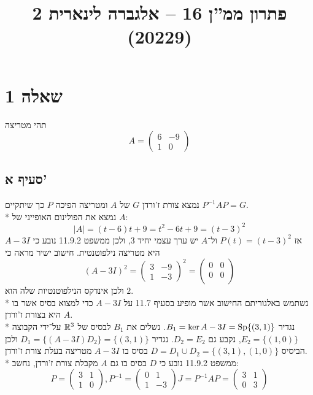 
\title{פתרון ממ''ן 16 – אלגברה לינארית 2 (20229)}


\maketitle
\maketitleprint{}

\section{שאלה 1}
תהי מטריצה
\[
	A = \begin{pmatrix}
		6 & -9 \\
		1 & 0
	\end{pmatrix}
\]
\subsection{סעיף א'}
נמצא צורת ז'ורדן $G$ של $A$ ומטריצה הפיכה $P$ כך שיתקיים $P^{-1} A P = G$. \\*
נמצא את הפולינום האופייני של $A$:
\[
	|A| = (t - 6) t + 9 = t^2 - 6t + 9 = {(t - 3)}^2
\]
אז $P(t) = {(t - 3)}^2$ ול־$A$ יש ערך עצמי יחיד $3$, ולכן ממשפט 11.9.2 נובע כי $A - 3I$ היא מטריצה נילפוטנטית.
חישוב ישיר מראה כי
\[
	{(A - 3I)}^2
	= \begin{pmatrix}
		3 & -9 \\
		1 & -3
	\end{pmatrix}^2
	= \begin{pmatrix}
		0 & 0 \\
		0 & 0 \\
	\end{pmatrix}
\]
ולכן אינדקס הנילפוטנטיות שלה הוא $2$. \\*
נשתמש באלגוריתם החישוב אשר מופיע בסעיף 11.7 על $A - 3I$ כדי למצוא בסיס אשר בו $A$ היא בצורת ז'ורדן. \\*
נגדיר $B_1 = \ker A - 3I = \operatorname{Sp}\{ (3, 1) \}$. נשלים את $B_1$ לבסיס של $\mathbb{R}^3$ על־ידי הקבוצה $E_2 = \{ (1, 0) \}$, נקבע גם $D_2 = E_2$. 
נגדיר $D_1 = \{ (A - 3I) D_2 \} = \{ (3, 1) \}$ ולכן הביסיס $D = D_1 \cup D_2 = \{ (3, 1), (1, 0) \}$ בסיס בו $A - 3I$ מטריצה בעלת צורת ז'ורדן. \\*
ממשפט 11.9.2 נובע כי $D$ בסיס בו גם $A$ מקבלת צורת ז'ורדן, נחשב:
\[
	P = \begin{pmatrix}
		3 & 1 \\
		1 & 0
	\end{pmatrix},
	P^{-1} = \begin{pmatrix}
		0 & 1 \\
		1 & -3
	\end{pmatrix}
	J = P^{-1} A P
	= \begin{pmatrix}
		3 & 1 \\
		0 & 3
	\end{pmatrix}
\]

